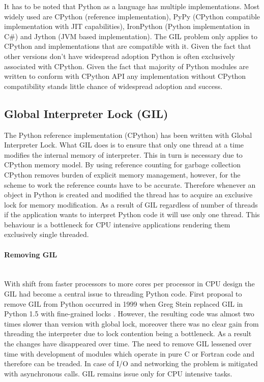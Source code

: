 \documentclass[12pt, a4paper]{report}
\newcommand{\myparagraph}[1]{\paragraph{#1}\mbox{}\\}
\begin{document}
It has to be noted that Python as a language has multiple implementations. Most
widely used are CPython (reference implementation), PyPy (CPython compatible implementation
with JIT capabilities), IronPython (Python implementation in C\#)
and Jython (JVM based implementation). The GIL problem only applies to CPython
and implementations that are compatible with it. Given the fact that other
versions don't have widespread adoption Python is often exclusively associated
with CPython. Given the fact that majority of Python modules are written to conform with
CPython API any implementation without CPython compatibility stands little chance
of widespread adoption and success.

\subsection{Global Interpreter Lock (GIL)}\label{subsec:GIL}
The Python reference implementation (CPython) has been written with Global
Interpreter Lock. What GIL does is to ensure that only one thread at a time
modifies the internal memory of interpreter. This in turn is necessary
due to CPython memory model. By using reference counting for garbage collection
CPython removes burden of explicit memory management, however, for the
scheme to work the reference counts have to be accurate. Therefore whenever
an object in Python is created and modified the thread has to acquire an
exclusive lock for memory modification. As a result of GIL regardless
of number of threads if the application wants to interpret Python code
it will use only one thread. This behaviour is a bottleneck for CPU
intensive applications rendering them exclusively single threaded.

\myparagraph{Removing GIL}\label{para:remove-gil}
With shift from faster processors to more cores per processor in CPU
design the GIL had become a central issue to threading Python code.
First proposal to remove GIL from Python occurred in 1999 when Greg Stein
replaced GIL in Python 1.5 with fine-grained locks \cite{Guido:GIL}. However, the resulting
code was almost two times slower than version with global lock,
moreover there was no clear gain from threading the interpreter due
to lock contention being a bottleneck. As a result the changes have
disappeared over time. The need to remove GIL lessened over time
with development of modules which operate in pure C or Fortran code
and therefore can be treaded. In case of I/O and networking the
problem is mitigated with asynchronous calls. GIL remains issue
only for CPU intensive tasks.
\end{document}
